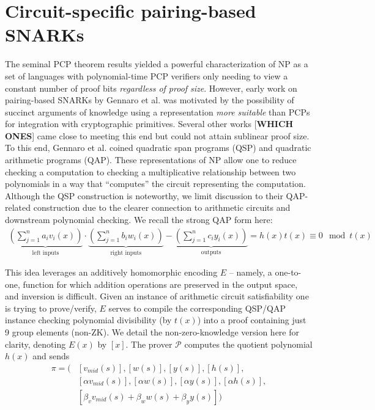 \section{Circuit-specific pairing-based SNARKs}
\noindent The seminal PCP theorem results \cite{pcpthm1, pcpthm2} yielded a powerful characterization of NP as a set of languages with polynomial-time PCP verifiers only needing to view a constant number of proof bits \textit{regardless of proof size}. However, early work on pairing-based SNARKs by Gennaro et al. \cite{snarknopcp} was motivated by the possibility of succinct arguments of knowledge using a representation \textit{more suitable} than PCPs for integration with cryptographic primitives. Several other works [\textbf{WHICH ONES}] came close to meeting this end but could not attain sublinear proof size.\\

\noindent To this end, Gennaro et al. \cite{snarknopcp} coined quadratic span programs (QSP) and quadratic arithmetic programs (QAP). These representations of NP allow one to reduce checking a computation to checking a multiplicative relationship between two polynomials in a way that ``computes'' the circuit representing the computation. Although the QSP construction is noteworthy, we limit discussion to their QAP-related construction due to the clearer connection to arithmetic circuits and downstream polynomial checking. We recall the strong QAP form here:
\begin{align}
\underbrace{\left(\sum_{j=1}^n a_i v_i(x)\right)}_{\text{left inputs}} \cdot \underbrace{\left(\sum_{j=1}^n b_i w_i(x)\right)}_{\text{right inputs}} - \underbrace{\left(\sum_{j=1}^n c_i y_i(x)\right)}_{\text{outputs}} = h(x) t(x) \equiv 0 \mod t(x)
\end{align}

\noindent This idea leverages an additively homomorphic encoding $E$ -- namely, a one-to-one, function for which addition operations are preserved in the output space, and inversion is difficult. Given an instance of arithmetic circuit satisfiability one is trying to prove/verify, $E$ serves to compile the corresponding QSP/QAP instance checking polynomial divisibility (by $t(x)$) into a proof containing just 9 group elements (non-ZK). We detail the non-zero-knowledge version here for clarity, denoting $E(x)$ by $[x]$. The prover $\mathcal{P}$ computes the quotient polynomial $h(x)$ and sends
\begin{align}
    \pi = \Big(&[v_{mid}(s)], [w(s)], [y(s)], [h(s)], \\ 
    &[\alpha v_{mid}(s)], [\alpha w(s)], [\alpha y(s)], [\alpha h(s)], \\ 
    &[\beta_v v_{mid}(s) + \beta_w w(s) + \beta_y y(s)]\Big)
\end{align}

